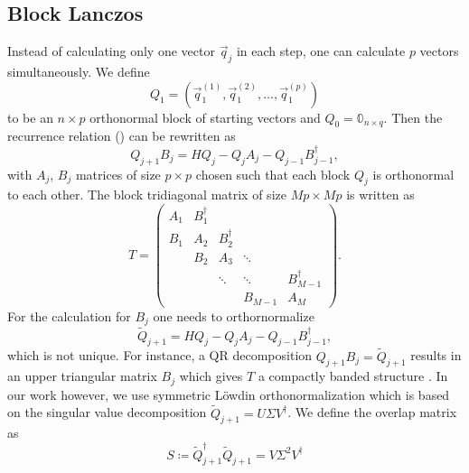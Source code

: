 \subsection{Block Lanczos}

Instead of calculating only one vector $\vec{q}_j$ in each step,
one can calculate $p$ vectors simultaneously.
We define
\begin{equation}
    Q_1 = (\vec{q}_1^{(1)}, \vec{q}_1^{(2)}, \ldots, \vec{q}_1^{(p)})
\end{equation}
to be an $n\times p$ orthonormal block of starting vectors
and $Q_0 = \mathbb{0}_{n\times q}$.
Then the recurrence relation () can be rewritten as
\begin{equation}
    Q_{j+1} B_j = H Q_j - Q_j A_j - Q_{j-1} B_{j-1}^\dag,
    \label{eq:block-Lanczos-recurrence}
\end{equation}
with $A_j$, $B_j$ matrices of size $p\times p$ chosen such that each block $Q_j$ is orthonormal
to each other.
The block tridiagonal matrix of size $Mp\times Mp$ is written as
\begin{equation}
    T
    =
    \begin{pmatrix}
        A_1 & B_1^\dag &          &         &              \\
        B_1 & A_2      & B_2^\dag &         &              \\
            & B_2      & A_3      & \ddots  &              \\
            &          & \ddots   & \ddots  & B_{M-1}^\dag \\
            &          &          & B_{M-1} & A_M
    \end{pmatrix}.
    \label{eq:tridiagonal-block}
\end{equation}
For the calculation for $B_j$ one needs to orthornormalize
\begin{equation}
    \tilde Q_{j+1} = H Q_j - Q_j A_j - Q_{j-1} B_{j-1}^\dag,
\end{equation}
which is not unique.
For instance, a QR decomposition $Q_{j+1} B_j = \tilde Q_{j+1}$
results in an upper triangular matrix $B_j$ which gives $T$ a compactly banded structure
\cite{Cullum1985, Golub2013}.
In our work however, we use symmetric Löwdin orthonormalization \cite{Lowdin1950, Brass2021}
which is based on the singular value decomposition
$\tilde Q_{j+1} = U \Sigma V^\dag$.
We define the overlap matrix as
\begin{equation}
    S \coloneqq \tilde Q_{j+1}^\dag \tilde Q_{j+1} = V \Sigma^2 V^\dag
\end{equation}
